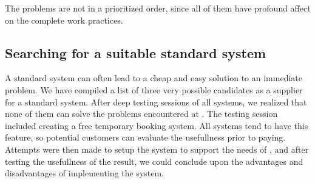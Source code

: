 The problems are not in a prioritized order, since all of them have profound
affect on the complete work practices.


\subsection{Searching for a suitable standard system}
A standard system can often lead to a cheap and easy solution to an immediate problem.
We have compiled a list of three very possible
candidates as a supplier for a standard system. 
After deep testing sessions of all systems, we realized that none
of them can solve the problems encountered at \gomonkey{}. The testing
session included creating a free temporary booking system. All systems tend to 
have this feature, so potential customers can evaluate the usefullness prior to 
paying. Attempts were then made to setup the system to support the needs of
\gomonkey{}, and after testing the usefullness of the result, we could conclude
upon the advantages and disadvantages of implementing the system.

